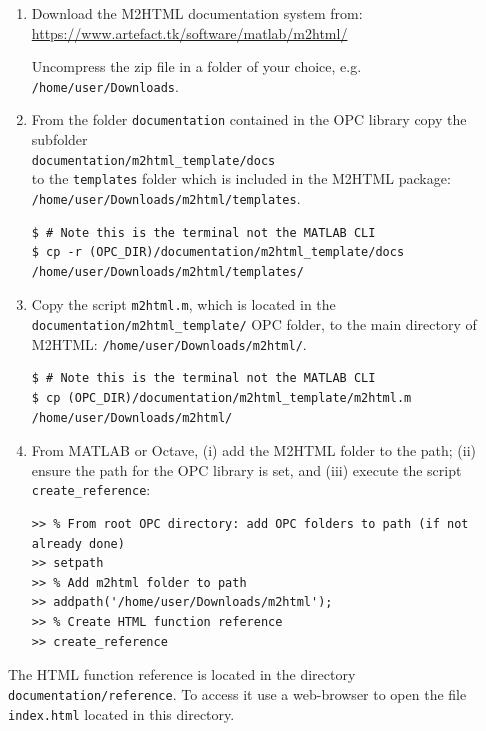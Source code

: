 \documentclass{book}
\begin{document}
\begin{enumerate}

\item Download the M2HTML documentation system from:
%
\url{https://www.artefact.tk/software/matlab/m2html/}

Uncompress the zip file in a folder of your choice, e.g.
{\tt /home/user/Downloads}.

\item From the folder {\tt documentation} contained in the OPC library copy the subfolder\\
{\tt documentation/m2html\_template/docs}\\
%
to the {\tt templates} folder which is included in the M2HTML package:\\
{\tt /home/user/Downloads/m2html/templates}.

\begin{verbatim}
$ # Note this is the terminal not the MATLAB CLI
$ cp -r (OPC_DIR)/documentation/m2html_template/docs /home/user/Downloads/m2html/templates/
\end{verbatim}


\item Copy the script
{\tt m2html.m}, which is located in the {\tt documentation/m2html\_template/} OPC folder,
to the main directory of M2HTML: 
{\tt /home/user/Downloads/m2html/}.

\begin{verbatim}
$ # Note this is the terminal not the MATLAB CLI
$ cp (OPC_DIR)/documentation/m2html_template/m2html.m /home/user/Downloads/m2html/
\end{verbatim}

\item From MATLAB or Octave, (i) add the M2HTML folder to the path;
(ii) ensure the path for the OPC library is set, and (iii) execute
the script {\tt create\_reference}:

\begin{verbatim}
>> % From root OPC directory: add OPC folders to path (if not already done)
>> setpath
>> % Add m2html folder to path
>> addpath('/home/user/Downloads/m2html');
>> % Create HTML function reference
>> create_reference
\end{verbatim}

\end{enumerate}

\noindent
%
The HTML function reference is located in the directory {\tt
documentation/reference}.  To access it use a web-browser to open the file {\tt
index.html} located in this directory.
\end{document}
